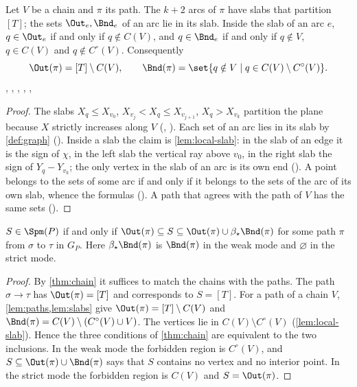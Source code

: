 \begin{lemma}[slabs]\label{lem:slabs}
Let $V$ be a chain and $\pi$ its path. The $k+2$ arcs of $\pi$ have slabs that partition $[T]$; the sets $\Out_e,\Bnd_e$ of an arc lie in its slab. Inside the slab of an arc $e$, $q\in\Out_e$ if and only if $q\notin C(V)$, and $q\in\Bnd_e$ if and only if $q\notin V$, $q\in C(V)$ and $q\notin C^\circ(V)$. Consequently
\[
\Out(\pi)=[T]\setminus C(V),\qquad \Bnd(\pi)=\set{q\notin V\mid q\in C(V)\setminus C^\circ(V)}.
\]
\hfill{}, , , , , 
\end{lemma}

\begin{proof}
The slabs $X_q\le X_{v_0}$, $X_{v_j}<X_q\le X_{v_{j+1}}$, $X_q>X_{v_k}$ partition the plane because $X$ strictly increases along $V$ (, ). Each set of an arc lies in its slab by \cref{def:graph} (). Inside a slab the claim is \cref{lem:local-slab}: in the slab of an edge it is the sign of $\chi$, in the left slab the vertical ray above $v_0$, in the right slab the sign of $Y_q-Y_{v_k}$; the only vertex in the slab of an arc is its own end (). A point belongs to the sets of some arc if and only if it belongs to the sets of the arc of its own slab, whence the formulas (). A path that agrees with the path of $V$ has the same sets ().
\end{proof}

\begin{theorem}[family]\label{thm:family}
$S\in\Spm(P)$ if and only if $\Out(\pi)\subseteq S\subseteq\Out(\pi)\cup\beta_\star\Bnd(\pi)$ for some path $\pi$ from $\sigma$ to $\tau$ in $G_P$. Here $\beta_\star\Bnd(\pi)$ is $\Bnd(\pi)$ in the weak mode and $\varnothing$ in the strict mode. \hfill{}
\end{theorem}

\begin{proof}
By \cref{thm:chain} it suffices to match the chains with the paths. The path $\sigma\to\tau$ has $\Out(\pi)=[T]$ and corresponds to $S=[T]$. For a path of a chain $V$, \cref{lem:paths,lem:slabs} give $\Out(\pi)=[T]\setminus C(V)$ and $\Bnd(\pi)=C(V)\setminus(C^\circ(V)\cup V)$. The vertices lie in $C(V)\setminus C^\circ(V)$ (\cref{lem:local-slab}). Hence the three conditions of \cref{thm:chain} are equivalent to the two inclusions. In the weak mode the forbidden region is $C^\circ(V)$, and $S\subseteq\Out(\pi)\cup\Bnd(\pi)$ says that $S$ contains no vertex and no interior point. In the strict mode the forbidden region is $C(V)$ and $S=\Out(\pi)$.
\end{proof}

